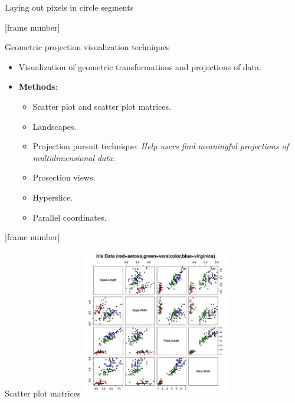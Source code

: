 \documentclass[aspectratio=169,t]{beamer}
\begin{document}
{\begin{frame}{Laying out pixels in circle segments}
    \end{frame}
  }

  {
    [frame number]
    \begin{frame}{Geometric projection visualization techniques}
    \begin{itemize}
      \item Visualization of geometric transformations and projections of data.
      \item \textbf{Methods}:
      \begin{itemize}
          \item Scatter plot and scatter plot matrices.
          \item Landscapes.
          \item Projection pursuit technique: \emph{Help users find meaningful projections of multidimensional data.}
          \item Prosection views.
          \item Hyperslice.
          \item Parallel coordinates.
      \end{itemize}
    \end{itemize}
    \end{frame}
  }

  {
    [frame number]
    \begin{frame}{Scatter plot matrices}
    \centering
    \includegraphics[height=6.5cm]{img/scatterplot_matrix.pdf}
    \end{frame}
  }
\end{document}
